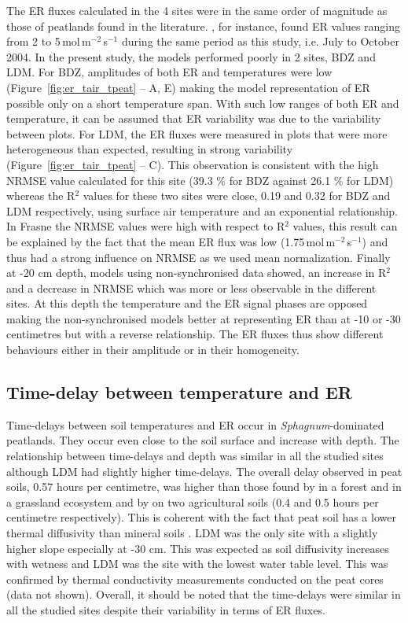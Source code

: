 The ER fluxes calculated in the 4 sites were in the same order of magnitude as those of peatlands found in the literature.
\citet{bortoluzzi2006a}, for instance, found ER values ranging from 2 to 5\,\textmu mol\,m$^{-2}$\,s$^{-1}$  during the same period as this study, i.e. July to October 2004.
In the present study, the models performed poorly in 2 sites, BDZ and LDM.
For BDZ, amplitudes of both ER and temperatures were low  (Figure~\ref{fig:er_tair_tpeat} -- A, E) making the model representation of ER possible only on a short temperature span.
With such low ranges of both ER and temperature, it can be assumed that ER variability was due to the variability between plots.
For LDM, the ER fluxes were measured in plots that were more heterogeneous than expected, resulting in strong variability (Figure~\ref{fig:er_tair_tpeat} -- C).
This observation is consistent with the high NRMSE value calculated for this site (39.3 \% for BDZ against 26.1 \% for LDM) whereas the R$^{2}$ values for these two sites were close, 0.19 and 0.32 for BDZ and LDM respectively, using surface air temperature and an exponential relationship.
In Frasne the NRMSE values were high with respect to R$^{2}$ values, this result can be explained by the fact that the mean ER flux was low (1.75\,\textmu mol\,m$^{-2}$\,s$^{-1}$) and thus had a strong influence on NRMSE as we used mean normalization.
Finally at -20 cm depth, models using non-synchronised data showed, an increase in R$^{2}$ and a decrease in NRMSE which was more or less observable in the different sites. %
At this depth the temperature and the ER signal phases are opposed making the non-synchronised models better at representing ER than at -10 or -30 centimetres but with a reverse relationship.
The ER fluxes thus show different behaviours either in their amplitude or in their homogeneity.

\subsection{Time-delay between temperature and ER}

Time-delays between soil temperatures and ER occur in \textit{Sphagnum}-dominated peatlands.
They occur even close to the soil surface and increase with depth.
The relationship between time-delays and depth was similar in all the studied sites although LDM had slightly higher time-delays.
The overall delay observed in peat soils, 0.57 hours per centimetre, was higher than those found by \citet{pavelka2007} in a forest and in a grassland ecosystem and by \citet{parkin2003} on two agricultural soils (0.4 and 0.5 hours per centimetre respectively).
This is coherent with the fact that peat soil has a lower thermal diffusivity than mineral soils \citep{farouki1981,arya2001}.
LDM was the only site with a slightly higher slope especially at -30 cm.
This was expected as soil diffusivity increases with wetness \citep{hillel2003} and LDM was the site with the lowest water table level.
This was confirmed by thermal conductivity measurements conducted on the peat cores (data not shown).
Overall, it should be noted that the time-delays were similar in all the studied sites despite their variability in terms of ER fluxes.

